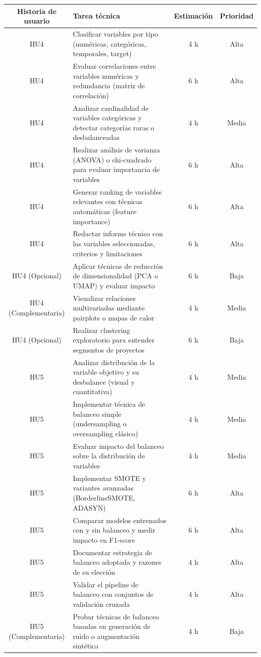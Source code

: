 \documentclass[
11pt, %
]{charter}
\begin{document}
\begin{table}[htpb]
\centering
\begin{tabularx}{\linewidth}{@{}|c|X|c|c|@{}}
\hline
\rowcolor[HTML]{C0C0C0}
Historia de usuario & Tarea técnica & Estimación & Prioridad \\ \hline

HU4 & Clasificar variables por tipo (numéricas, categóricas, temporales, target) & 4 h & Alta \\ \hline
HU4 & Evaluar correlaciones entre variables numéricas y redundancia (matriz de correlación) & 6 h & Alta \\ \hline
HU4 & Analizar cardinalidad de variables categóricas y detectar categorías raras o desbalanceadas & 4 h & Media \\ \hline
HU4 & Realizar análisis de varianza (ANOVA) o chi-cuadrado para evaluar importancia de variables & 6 h & Alta \\ \hline
HU4 & Generar ranking de variables relevantes con técnicas automáticas (feature importance) & 6 h & Alta \\ \hline
HU4 & Redactar informe técnico con las variables seleccionadas, criterios y limitaciones & 6 h & Alta \\ \hline
HU4 (Opcional) & Aplicar técnicas de reducción de dimensionalidad (PCA o UMAP) y evaluar impacto & 6 h & Baja \\ \hline
HU4 (Complementaria) & Visualizar relaciones multivariadas mediante pairplots o mapas de calor & 4 h & Media \\ \hline
HU4 (Opcional) & Realizar clustering exploratorio para entender segmentos de proyectos & 6 h & Baja \\ \hline

HU5 & Analizar distribución de la variable objetivo y su desbalance (visual y cuantitativa) & 4 h & Media \\ \hline
HU5 & Implementar técnica de balanceo simple (undersampling o oversampling clásico) & 4 h & Media \\ \hline
HU5 & Evaluar impacto del balanceo sobre la distribución de variables & 4 h & Media \\ \hline
HU5 & Implementar SMOTE y variantes avanzadas (BorderlineSMOTE, ADASYN) & 6 h & Alta \\ \hline
HU5 & Comparar modelos entrenados con y sin balanceo y medir impacto en F1-score & 6 h & Alta \\ \hline
HU5 & Documentar estrategia de balanceo adoptada y razones de su elección & 4 h & Alta \\ \hline
HU5 & Validar el pipeline de balanceo con conjuntos de validación cruzada & 4 h & Alta \\ \hline
HU5 (Complementaria) & Probar técnicas de balanceo basadas en generación de ruido o augmentación sintética & 4 h & Baja \\ \hline


\end{tabularx}
\end{table}
\end{document}
